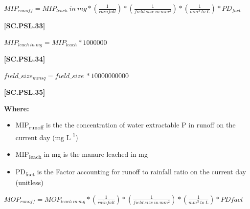     \begin{center}
\(MIP_{runoff} = MIP_{leach}\ in\ mg *(\frac{1}{rainfall})*(\frac{1}{field\ size\ in\ mm^2})*(\frac{1}{mm^3\ to\ L})*PD_{fact}\)
    \end{center}
        \vspace{0.5cm} 
    
            {\raggedleft \textbf{[SC.PSL.33]}\par}
            \vspace{0.5cm}
            
    \begin{center}
\(MIP_{leach\ in\ mg}= MIP_{leach}*1000000\)
    \end{center}
        \vspace{0.5cm} 
    
            {\raggedleft \textbf{[SC.PSL.34]}\par}
            \vspace{0.5cm}

    \begin{center}
\(field\_size_{mmsq}= field\_size\ *10000000000\)

    \end{center}
        \vspace{0.5cm} 
    
            {\raggedleft \textbf{[SC.PSL.35]}\par}
            \vspace{0.5cm}

        \textbf{Where:}
            
        \begin{itemize}
            \item MIP\textsubscript{runoff} is the the concentration of water extractable P in runoff on the current day (mg L\textsuperscript{-1})
            \item MIP\textsubscript{leach} in mg is the manure leached in mg
            \item PD\textsubscript{fact} is the Factor accounting for runoff to rainfall ratio on the current day (unitless)
        \end{itemize}
        \vspace{0.5cm}
        
    \begin{center}
\(MOP_{runoff} = MOP_{leach\ in\ mg} *(\frac{1}{rainfall})*(\frac{1}{field\ size\ in\ mm^2})*(\frac{1}{mm^3\ to\ L})*PDfact\)

    \end{center}
        \vspace{0.5cm} 
    
